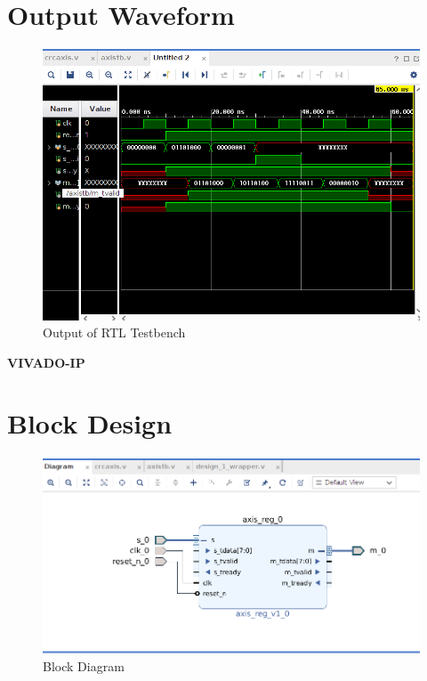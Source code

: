 \documentclass{article}
\begin{document}
\section{Output Waveform}
\vspace{1cm}
\begin{figure}[h]
    \centering
\includegraphics[width=\columnwidth]{figs/p2rtlwav.png}
    \caption{Output of RTL Testbench}
    \label{fig:my_label}
\end{figure}

\vspace{20cm}


\maketitle
\hfill \textbf{VIVADO-IP}
\section{Block Design}
\vspace{1cm}
\begin{figure}[h]
    \centering
\includegraphics[width=\columnwidth]{figs/p2ipbd.png}
    \caption{Block Diagram}
    \label{fig:my_label}
\end{figure}
\vspace{3cm}
\end{document}
